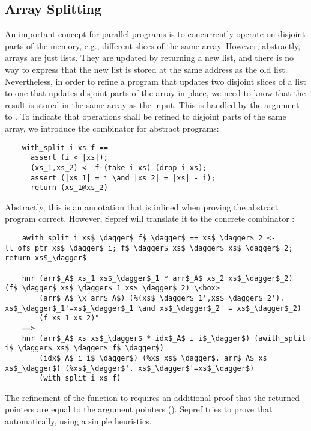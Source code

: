 \documentclass[a4paper,UKenglish,cleveref, autoref, thm-restate]{lipics-v2021}
\begin{document}
  \subsection{Array Splitting}\label{sec::array_split}
  An important concept for parallel programs is to concurrently operate on disjoint parts of the memory,
  e.g., different slices of the same array. However, abstractly, arrays are just lists. They are updated
  by returning a new list, and there is no way to express that the new list is stored at the same address as the old list.
  Nevertheless, in order to refine a program that updates two disjoint slices of a list to one that updates disjoint
  parts of the array in place, we need to know that the result is stored in the same array as the input.
  This is handled by the  argument to . To indicate that operations shall be refined to disjoint parts of the same array, we introduce the
  combinator  for abstract programs:
  \begin{lstlisting}
    with_split i xs f ==
      assert (i < |xs|);
      (xs_1,xs_2) <- f (take i xs) (drop i xs);
      assert (|xs_1| = i \and |xs_2| = |xs| - i);
      return (xs_1@xs_2)
  \end{lstlisting}
  Abstractly, this is an annotation that is inlined when proving the abstract program correct.
  However, Sepref will translate it to the concrete combinator :
  \begin{lstlisting}
    awith_split i xs$_\dagger$ f$_\dagger$ == xs$_\dagger$_2 <- ll_ofs_ptr xs$_\dagger$ i; f$_\dagger$ xs$_\dagger$ xs$_\dagger$_2; return xs$_\dagger$

    hnr (arr$_A$ xs_1 xs$_\dagger$_1 * arr$_A$ xs_2 xs$_\dagger$_2) (f$_\dagger$ xs$_\dagger$_1 xs$_\dagger$_2) \<box>
        (arr$_A$ \x arr$_A$) (%(xs$_\dagger$_1',xs$_\dagger$_2'). xs$_\dagger$_1'=xs$_\dagger$_1 \and xs$_\dagger$_2' = xs$_\dagger$_2)
        (f xs_1 xs_2)"
    ==>
    hnr (arr$_A$ xs xs$_\dagger$ * idx$_A$ i i$_\dagger$) (awith_split i$_\dagger$ xs$_\dagger$ f$_\dagger$)
        (idx$_A$ i i$_\dagger$) (%xs xs$_\dagger$. arr$_A$ xs xs$_\dagger$) (%xs$_\dagger$'. xs$_\dagger$'=xs$_\dagger$)
        (with_split i xs f)
  \end{lstlisting}
  The refinement of the function  to  requires an additional proof that the returned pointers
  are equal to the argument pointers ().
  Sepref tries to prove that automatically, using a simple heuristics.
\end{document}
